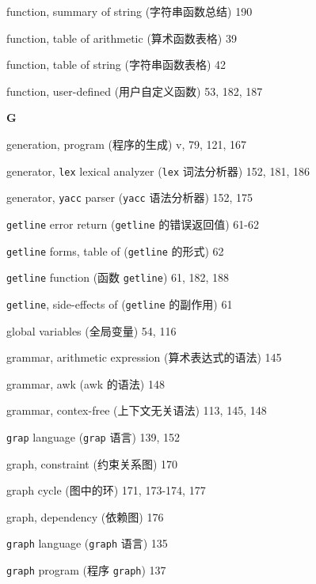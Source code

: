 \begin{multicols}{2}
\hangindent=2pc  function, summary of string (字符串函数总结) 190

\hangindent=2pc  function, table of arithmetic (算术函数表格) 39

\hangindent=2pc  function, table of string (字符串函数表格) 42

\hangindent=2pc  function, user-defined (用户自定义函数) 53, 182, 187

\medskip\textbf{\large{G}}

\hangindent=2pc  generation, program (程序的生成) v, 79, 121, 167

\hangindent=2pc  generator, \verb'lex' lexical analyzer
(\verb'lex' 词法分析器) 152, 181, 186

\hangindent=2pc  generator, \verb'yacc' parser (\verb'yacc'
语法分析器) 152, 175

\hangindent=2pc  \verb'getline' error return (\verb'getline'
的错误返回值) 61-62

\hangindent=2pc  \verb'getline' forms, table of (\verb'getline'
的形式) 62

\hangindent=2pc  \verb'getline' function (函数 \verb'getline')
61, 182, 188

\hangindent=2pc  \verb'getline', side-effects of
(\verb'getline' 的副作用) 61

\hangindent=2pc  global variables (全局变量) 54, 116

\hangindent=2pc  grammar, arithmetic expression
(算术表达式的语法) 145

\hangindent=2pc  grammar, awk (awk 的语法) 148

\hangindent=2pc  grammar, contex-free (上下文无关语法) 113, 145, 148

\hangindent=2pc  \verb'grap' language (\verb'grap' 语言) 139, 152

\hangindent=2pc  graph, constraint (约束关系图) 170

\hangindent=2pc  graph cycle (图中的环) 171, 173-174, 177

\hangindent=2pc  graph, dependency (依赖图) 176

\hangindent=2pc  \verb'graph' language (\verb'graph' 语言) 135

\hangindent=2pc  \verb'graph' program (程序 \verb'graph') 137


\end{multicols}
